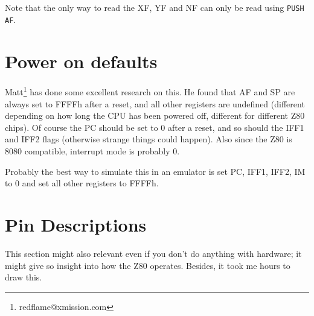 \documentclass[oneside,a4paper]{book}
\begin{document}
Note that the only way to read the XF, YF and NF can only be read using
{\tt PUSH AF}.


\section{Power on defaults}
\label{pon}

Matt\footnote{redflame@xmission.com} has done some excellent research on 
this. He found that AF and SP are always set to FFFFh after a reset, and 
all other registers are undefined (different depending on how long the CPU 
has been powered off, different for different Z80 chips). Of course the PC 
should be set to 0 after a reset, and so should the IFF1 and IFF2 flags 
(otherwise strange things could happen). Also since the Z80 is 8080 
compatible, interrupt mode is probably 0.

Probably the best way to simulate this in an emulator is set PC, IFF1,
IFF2, IM to 0 and set all other registers to FFFFh.


\section{Pin Descriptions \cite{datasheet}}

This section might also relevant even if you don't do anything with 
hardware; it might give so insight into how the Z80 operates. Besides, 
it took me hours to draw this.\\[1ex]
\end{document}
